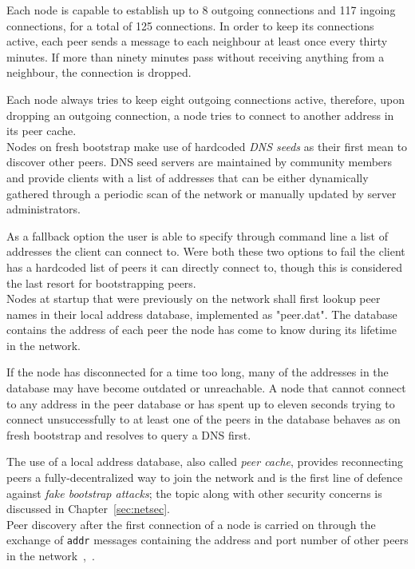 \documentclass[12pt, letterpaper, twoside]{article}
\begin{document}
Each node is capable to establish up to 8 outgoing connections and 117 ingoing connections, for a total of 125 connections. In order to keep its connections active, each peer sends a message to each neighbour at least once every thirty minutes. If more than ninety minutes pass without receiving anything from a neighbour, the connection is dropped.

Each node always tries to keep eight outgoing connections active, therefore, upon dropping an outgoing connection, a node tries to connect to another address in its peer cache.\\

Nodes on fresh bootstrap make use of hardcoded \emph{DNS seeds} as their first mean to discover other peers. DNS seed servers are maintained by community members and provide clients with a list of addresses that can be either dynamically gathered through a periodic scan of the network or manually updated by server administrators.

As a fallback option the user is able to specify through command line a list of addresses the client can connect to. Were both these two options to fail the client has a hardcoded list of peers it can directly connect to, though this is considered the last resort for bootstrapping peers.\\

Nodes at startup that were previously on the network shall first lookup peer names in their local address database, implemented as "peer.dat". The database contains the address of each peer the node has come to know during its lifetime in the network.

If the node has disconnected for a time too long, many of the addresses in the database may have become outdated or unreachable. A node that cannot connect to any address in the peer database or has spent up to eleven seconds trying to connect unsuccessfully to at least one of the peers in the database behaves as on fresh bootstrap and resolves to query a DNS first.

The use of a local address database, also called \emph{peer cache}, provides reconnecting peers a fully-decentralized way to join the network and is the first line of defence against \emph{fake bootstrap attacks}; the topic along with other security concerns is discussed in Chapter~\ref{sec:netsec}.\\

Peer discovery after the first connection of a node is carried on through the exchange of \texttt{addr} messages containing the address and port number of other peers in the network~\cite{protocoldoc},~\cite{devguidep2p}.
\end{document}

